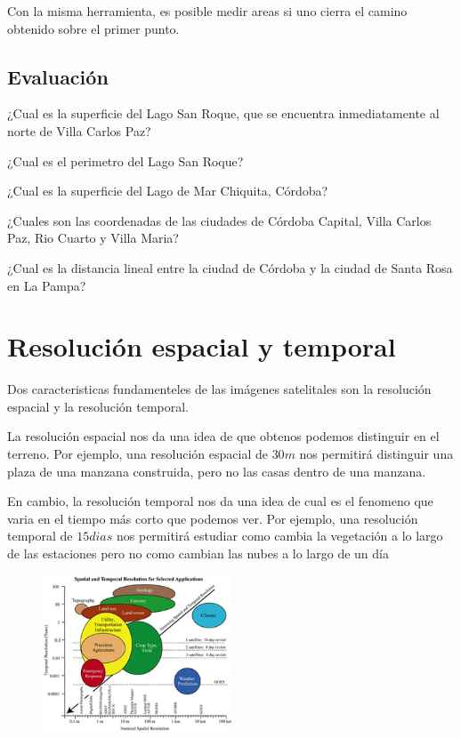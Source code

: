 \documentclass[a4paper,12pt]{book}
\begin{document}
Con la misma herramienta, es posible medir areas si uno cierra el camino obtenido sobre el primer punto.

\section{Evaluación}

\begin{que}
    ¿Cual es la superficie del Lago San Roque, que se encuentra inmediatamente al norte de Villa Carlos Paz?
\end{que}
\begin{que}
    ¿Cual es el perimetro del Lago San Roque?
\end{que}
\begin{que}
    ¿Cual es la superficie del Lago de Mar Chiquita, Córdoba?
\end{que}

\begin{que}
    ¿Cuales son las coordenadas de las ciudades de Córdoba Capital, Villa Carlos Paz, Rio Cuarto y Villa Maria?
\end{que}

\begin{que}
    ¿Cual es la distancia lineal entre la ciudad de Córdoba y la ciudad de Santa Rosa en La Pampa?
\end{que}

\chapter{Resolución espacial y temporal}
Dos caracteristicas fundamenteles de las imágenes satelitales son la resolución espacial y la resolución temporal.

La resolución espacial nos da una idea de que obtenos podemos distinguir en el terreno. Por ejemplo, una resolución espacial de $30m$ nos permitirá distinguir una plaza de una manzana construida, pero no las casas dentro de una manzana.

En cambio, la resolución temporal nos da una idea de cual es el fenomeno que varia en el tiempo más corto que podemos ver. Por ejemplo, una resolución temporal de $15 dias$ nos permitirá estudiar como cambia la vegetación a lo largo de las estaciones pero no como cambian las nubes a lo largo de un día


\begin{figure}[h!]
    \centering
    \includegraphics[width=0.5\textwidth]{fig:evst.jpg}
    \caption{}
    \label{fig:evst}
\end{figure}
\end{document}
